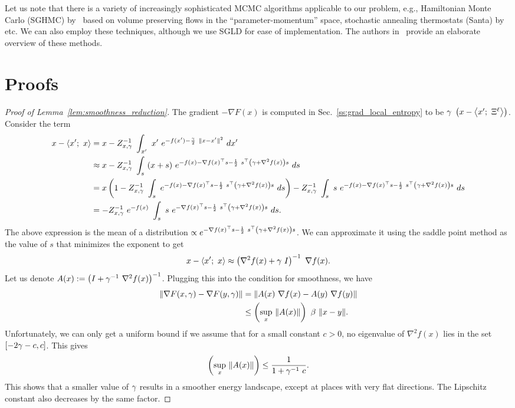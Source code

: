 \documentclass[10pt]{article}
\newcommand{\minibatch}[1]{\Xi^{#1}}
\begin{document}
\begin{appendices}
Let us note that there is a variety of increasingly sophisticated MCMC algorithms applicable to our problem, e.g., Hamiltonian Monte Carlo (SGHMC) by~\citet{chen2014stochastic} based on volume preserving flows in the ``parameter-momentum'' space, stochastic annealing thermostats (Santa) by~\citet{chen2015bridging} etc. We can also employ these techniques, although we use SGLD for ease of implementation. The authors in~\citet{ma2015complete} provide an elaborate overview of these methods.

\section{Proofs}
\label{s:app:proofs}

\begin{proof}[Proof of Lemma~\ref{lem:smoothness_reduction}]
The gradient $-\nabla F(x)$ is computed in Sec.~\ref{ss:grad_local_entropy} to be $\g\ \rbrac{x - \ag{x';\ \minibatch{\ell}}}$. Consider the term
\begin{align*}
    x - \ag{x';\ x}
    &= x - Z_{x,\g}^{-1}\ \int_{x'}\ x'\ e^{-f(x') - \f{\g}{2}\ \norm{x-x'}^2}\ dx'\\
    &\approx x - Z_{x,\g}^{-1}\ \int_{s}\ (x + s)\ e^{-f(x) - \nabla f(x)^\top s - \f{1}{2}\ s^\top \rbrac{\g + \nabla^2 f(x)} s}\ ds\\
    &= x\rbrac{1 -  Z_{x,\g}^{-1}\ \int_{s}\ e^{-f(x) - \nabla f(x)^\top s - \f{1}{2}\ s^\top \rbrac{\g + \nabla^2 f(x)} s}\ ds} - Z_{x,\g}^{-1}\ \int_{s}\ s\ e^{-f(x) - \nabla f(x)^\top s - \f{1}{2}\ s^\top \rbrac{\g + \nabla^2 f(x)} s}\ ds\\
    &= -Z_{x,\g}^{-1}\ e^{-f(x)}\ \int_{s}\ s\ e^{-\nabla f(x)^\top s - \f{1}{2}\ s^\top \rbrac{\g + \nabla^2 f(x)} s}\ ds.
\end{align*}
The above expression is the mean of a distribution $\propto e^{-\nabla f(x)^\top s - \frac{1}{2}\ s^\top \left(\gamma + \nabla^2 f(x)\right) s}$. We can approximate it using the saddle point method as the value of $s$ that minimizes the exponent to get
$$
    x - \left\langle x';\ x\right\rangle \approx \left(\nabla^2 f(x) + \gamma\ I\right)^{-1}\ \nabla f(x).
$$
Let us denote $A(x) := \left(I + \gamma^{-1}\ \nabla^2 f(x)\right)^{-1}$. Plugging this into the condition for smoothness, we have
\begin{align*}
    \lVert\nabla F(x, \gamma) - \nabla F(y, \gamma)\rVert
    &= \lVert A(x)\ \nabla f(x) - A(y)\ \nabla f(y)\rVert\\
    &\leq \left(\sup_x\ \lVert A(x)\rVert\right)\ \beta\ \lVert x-y\rVert.
\end{align*}
Unfortunately, we can only get a uniform bound if we assume that for a small constant $c > 0$, no eigenvalue of $\nabla^2 f(x)$ lies in the set $[-2 \gamma -c, c]$. This gives
$$
    \left(\sup_x\ \lVert A(x)\rVert\right) \leq \frac{1}{1+\gamma^{-1}\ c}.
$$
This shows that a smaller value of $\gamma$ results in a smoother energy landscape, except at places with very flat directions. The Lipschitz constant also decreases by the same factor.
\end{proof}


\end{appendices}
\end{document}
